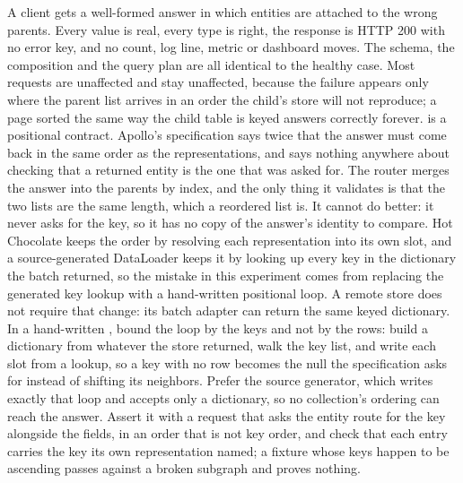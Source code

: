 \begin{problemsummary}
{A client gets a well-formed answer in which entities are attached to the wrong
parents. Every value is real, every type is right, the response is HTTP 200
with no error key, and no count, log line, metric or dashboard moves. The
schema, the composition and the query plan are all identical to the healthy
case. Most requests are unaffected and stay unaffected, because the failure
appears only where the parent list arrives in an order the child's store will
not reproduce; a page sorted the same way the child table is keyed answers
correctly forever.}
{ is a positional contract. Apollo's specification says twice
that the answer must come back in the same order as the representations, and
says nothing anywhere about checking that a returned entity is the one that was
asked for. The router merges the answer into the parents by index, and the only
thing it validates is that the two lists are the same length, which a reordered
list is. It cannot do better: it never asks for the key, so it has no copy of
the answer's identity to compare. Hot Chocolate keeps the order by resolving
each representation into its own slot, and a source-generated DataLoader keeps
it by looking up every key in the dictionary the batch returned, so the mistake
in this experiment comes from replacing the generated key lookup with a
hand-written positional loop. A remote store does not require that change:
its batch adapter can return the same keyed dictionary.}
{In a hand-written , bound the loop by the keys and not by
the rows: build a dictionary from whatever the store returned, walk the key
list, and write each slot from a lookup, so a key with no row becomes the null
the specification asks for instead of shifting its neighbors. Prefer the
source generator, which writes exactly that loop and accepts only a dictionary,
so no collection's ordering can reach the answer. Assert it with a request that
asks the
entity route for the key alongside the fields, in an order that is not key
order, and check that each entry carries the key its own representation named;
a fixture whose keys happen to be ascending passes against a broken subgraph
and proves nothing.}
\end{problemsummary}
